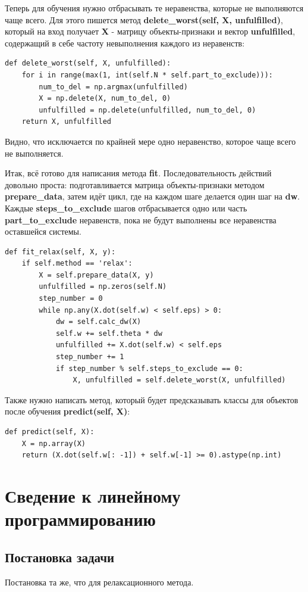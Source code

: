 \documentclass[a4paper]{article}
\begin{document}
Теперь для обучения нужно отбрасывать те неравенства, которые не выполняются чаще всего. Для этого пишется метод \textbf{delete\_worst(self, X, unfulfilled)}, который на вход получает \textbf{X}  - матрицу объекты-призна\-ки и вектор \textbf{unfulfilled}, содержащий в себе частоту невыполнения каждого из неравенств:
\begin{lstlisting}
def delete_worst(self, X, unfulfilled):
	for i in range(max(1, int(self.N * self.part_to_exclude))):
		num_to_del = np.argmax(unfulfilled)
		X = np.delete(X, num_to_del, 0)
		unfulfilled = np.delete(unfulfilled, num_to_del, 0)
	return X, unfulfilled
\end{lstlisting}

Видно, что исключается по крайней мере одно неравенство, которое чаще всего не выполняется.

Итак, всё готово для написания метода \textbf{fit}. Последовательность действий довольно проста: подготавливается матрица объекты-признаки методом \textbf{prepare\_data}, затем идёт цикл, где на каждом шаге делается один шаг на \textbf{dw}. Каждые \textbf{steps\_to\_exclude} шагов отбрасывается одно или часть \textbf{part\_to\_exclude} неравенств, пока не будут выполнены все неравенства оставшейся системы.
\begin{lstlisting}
def fit_relax(self, X, y):
	if self.method == 'relax':
		X = self.prepare_data(X, y)
		unfulfilled = np.zeros(self.N)
		step_number = 0
		while np.any(X.dot(self.w) < self.eps) > 0:
			dw = self.calc_dw(X)
			self.w += self.theta * dw
			unfulfilled += X.dot(self.w) < self.eps
			step_number += 1
			if step_number % self.steps_to_exclude == 0:
				X, unfulfilled = self.delete_worst(X, unfulfilled)
\end{lstlisting}

Также нужно написать метод, который будет предсказывать классы для объектов после обучения \textbf{predict(self, X)}:
\begin{lstlisting}
def predict(self, X):
	X = np.array(X)
	return (X.dot(self.w[: -1]) + self.w[-1] >= 0).astype(np.int)
\end{lstlisting}

\section{Сведение к линейному программированию}
\subsection{Постановка задачи}
Постановка та же, что для релаксационного метода.
\end{document}
